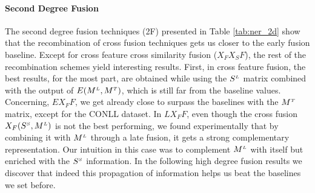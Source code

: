 \paragraph{Second Degree Fusion} 
The second degree fusion techniques (2F) presented in Table \ref{tab:ner_2d} show that the recombination of cross fusion techniques gets us closer to the early fusion baseline. Except for cross feature cross similarity fusion ($X_FX_SF$), the rest of the recombination schemes yield interesting results. First, in cross feature fusion, the best results, for the most part, are obtained while using the $S^{\scriptscriptstyle L}$ matrix combined with the output of $E(M^{\scriptscriptstyle L}, M^{\scriptscriptstyle T})$, which is still far from the baseline values. Concerning, $EX_FF$, we get already close to surpass the baselines with the $M^{\scriptscriptstyle T}$ matrix, except for the CONLL dataset. In $LX_FF$, even though the cross fusion $X_F(S^{\scriptscriptstyle S}, M^{\scriptscriptstyle L})$ is not the best performing, we found experimentally that by combining it with $M^{\scriptscriptstyle L}$ through a late fusion, it gets  a strong complementary representation. Our intuition in this case was to complement $M^{\scriptscriptstyle L}$ with itself but enriched with the $S^{\scriptscriptstyle S}$ information. In the following high degree fusion results we discover that indeed this propagation of information helps us beat the baselines we set before.


